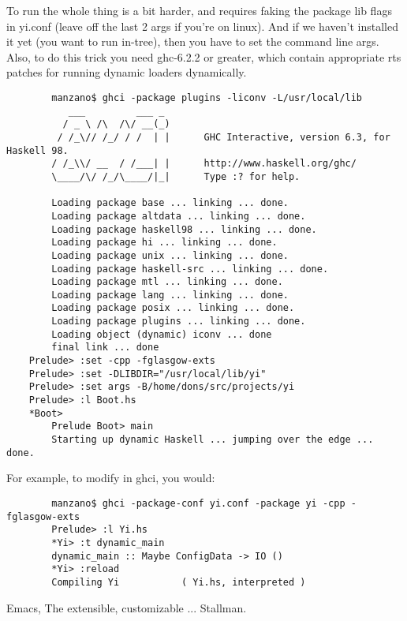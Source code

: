 To run the whole thing is a bit harder, and requires faking the package
lib flags in yi.conf (leave off the last 2 args if you're on linux). And
if we haven't installed it yet (you want to run in-tree), then you have
to set the command line args. Also, to do this trick you need ghc-6.2.2
or greater, which contain appropriate rts patches for running dynamic
loaders dynamically.

\begin{verbatim}
        manzano$ ghci -package plugins -liconv -L/usr/local/lib
           ___         ___ _
          / _ \ /\  /\/ __(_)
         / /_\// /_/ / /  | |      GHC Interactive, version 6.3, for Haskell 98.
        / /_\\/ __  / /___| |      http://www.haskell.org/ghc/
        \____/\/ /_/\____/|_|      Type :? for help.

        Loading package base ... linking ... done.
        Loading package altdata ... linking ... done.
        Loading package haskell98 ... linking ... done.
        Loading package hi ... linking ... done.
        Loading package unix ... linking ... done.
        Loading package haskell-src ... linking ... done.
        Loading package mtl ... linking ... done.
        Loading package lang ... linking ... done.
        Loading package posix ... linking ... done.
        Loading package plugins ... linking ... done.
        Loading object (dynamic) iconv ... done
        final link ... done
	Prelude> :set -cpp -fglasgow-exts
	Prelude> :set -DLIBDIR="/usr/local/lib/yi"
	Prelude> :set args -B/home/dons/src/projects/yi
	Prelude> :l Boot.hs
	*Boot>
        Prelude Boot> main
        Starting up dynamic Haskell ... jumping over the edge ... done.
\end{verbatim}

For example, to modify  in ghci, you would:

\begin{verbatim}
        manzano$ ghci -package-conf yi.conf -package yi -cpp -fglasgow-exts
        Prelude> :l Yi.hs
        *Yi> :t dynamic_main
        dynamic_main :: Maybe ConfigData -> IO ()
        *Yi> :reload
        Compiling Yi           ( Yi.hs, interpreted )
\end{verbatim}

\begin{thebibliography}[50]
\bibitem Emacs, The extensible, customizable ... Stallman.
\end{thebibliography}
